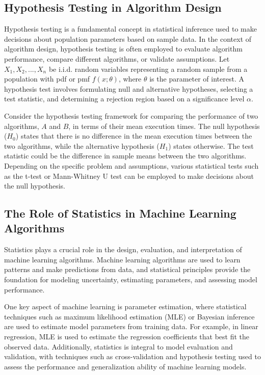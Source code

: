 \documentclass[12pt]{book} %
\begin{document}
\subsection{Hypothesis Testing in Algorithm Design}
Hypothesis testing is a fundamental concept in statistical inference used to make decisions about population parameters based on sample data. In the context of algorithm design, hypothesis testing is often employed to evaluate algorithm performance, compare different algorithms, or validate assumptions. Let \(X_1, X_2, ..., X_n\) be i.i.d. random variables representing a random sample from a population with pdf or pmf \(f(x; \theta)\), where \(\theta\) is the parameter of interest. A hypothesis test involves formulating null and alternative hypotheses, selecting a test statistic, and determining a rejection region based on a significance level \(\alpha\).

Consider the hypothesis testing framework for comparing the performance of two algorithms, \(A\) and \(B\), in terms of their mean execution times. The null hypothesis (\(H_0\)) states that there is no difference in the mean execution times between the two algorithms, while the alternative hypothesis (\(H_1\)) states otherwise. The test statistic could be the difference in sample means between the two algorithms. Depending on the specific problem and assumptions, various statistical tests such as the t-test or Mann-Whitney U test can be employed to make decisions about the null hypothesis.

\subsection{The Role of Statistics in Machine Learning Algorithms}
Statistics plays a crucial role in the design, evaluation, and interpretation of machine learning algorithms. Machine learning algorithms are used to learn patterns and make predictions from data, and statistical principles provide the foundation for modeling uncertainty, estimating parameters, and assessing model performance.

One key aspect of machine learning is parameter estimation, where statistical techniques such as maximum likelihood estimation (MLE) or Bayesian inference are used to estimate model parameters from training data. For example, in linear regression, MLE is used to estimate the regression coefficients that best fit the observed data. Additionally, statistics is integral to model evaluation and validation, with techniques such as cross-validation and hypothesis testing used to assess the performance and generalization ability of machine learning models.
\end{document}
